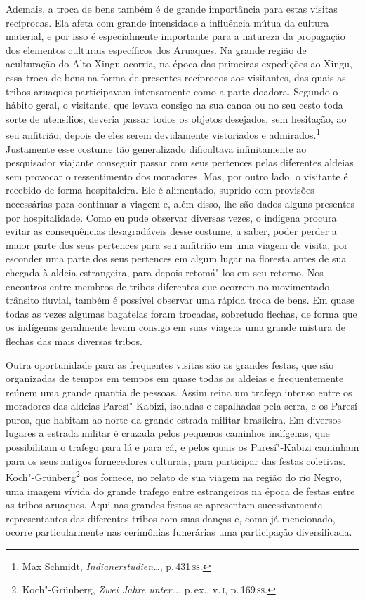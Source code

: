 Ademais, a troca de bens também é de grande importância para estas
visitas recíprocas. Ela afeta com grande intensidade a influência mútua
da cultura material, e por isso é especialmente importante para a
natureza da propagação dos elementos culturais específicos dos Aruaques.
Na grande região de aculturação do Alto Xingu ocorria, na época das
primeiras expedições ao Xingu, essa troca de bens na forma de presentes
recíprocos aos visitantes, das quais as tribos aruaques participavam
intensamente como a parte doadora. Segundo o hábito geral, o
visitante, que levava consigo na sua canoa ou no seu cesto toda sorte
de utensílios, deveria passar todos os objetos desejados, sem hesitação,
ao seu anfitrião, depois de eles serem devidamente vistoriados e
admirados.\footnote{Max Schmidt, \textit{Indianerstudien\ldots}, p.\,431\,\textsc{ss}.} Justamente esse costume tão
generalizado dificultava infinitamente ao pesquisador viajante conseguir
passar com seus pertences pelas diferentes aldeias sem provocar o
ressentimento dos moradores. Mas, por outro lado, o visitante é recebido
de forma hospitaleira. Ele é alimentado, suprido com provisões
necessárias para continuar a viagem e, além disso, lhe são dados alguns
presentes por hospitalidade. Como eu pude observar diversas vezes, o
indígena procura evitar as consequências desagradáveis desse costume, a
saber, poder perder a maior parte dos seus pertences para seu anfitrião
em uma viagem de visita, por esconder uma parte dos seus pertences em
algum lugar na floresta antes de sua chegada à aldeia estrangeira, para
depois retomá"-los em seu retorno. Nos encontros entre membros de tribos
diferentes que ocorrem no movimentado trânsito fluvial, também é
possível observar uma rápida troca de bens. Em quase todas as vezes
algumas bagatelas foram trocadas, sobretudo flechas, de forma que os
indígenas geralmente levam consigo em suas viagens uma grande mistura de
flechas das mais diversas tribos.

{Outra oportunidade para as frequentes visitas são as grandes festas,
que são organizadas de tempos em tempos em quase todas as aldeias e
frequentemente reúnem uma grande quantia de pessoas. Assim reina um
trafego intenso entre os moradores das aldeias Paresí"-Kabizi, isoladas e
espalhadas pela serra, e os Paresí puros, que habitam ao norte da grande
estrada militar brasileira. Em diversos lugares a estrada militar é
cruzada pelos pequenos caminhos indígenas, que possibilitam o trafego
para lá e para cá, e pelos quais os Paresí"-Kabizi caminham para os seus
antigos fornecedores culturais, para participar das festas coletivas.
Koch"-Grünberg\footnote{Koch"-Grünberg, \textit{Zwei Jahre unter\ldots}, p.\,ex., v.\,\textsc{i}, p.\,169\,\textsc{ss}.} nos fornece, no relato de sua
viagem na região do rio Negro, uma imagem vívida do grande trafego
entre estrangeiros na época de festas entre as tribos aruaques. Aqui nas
grandes festas se apresentam sucessivamente representantes das
diferentes tribos com suas danças e, como já mencionado, ocorre
particularmente nas cerimônias funerárias uma participação
diversificada.}

